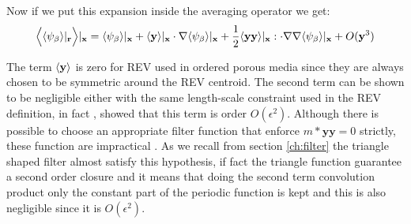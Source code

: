 Now if we put this expansion inside the averaging operator we get:
$$
\Big< {\left< \psi_{\beta} \right>}|_{\mathbf{r}} \Big>|_{\mathbf{x}} = {\left< \psi_{\beta} \right>}|_{\mathbf{x}} + {\left< \mathbf{y} \right>}|_{\mathbf{x}} \cdot \nabla {\left< \psi_{\beta} \right>}|_{\mathbf{x}} + \dfrac{1}{2} {\left< \mathbf{y}\mathbf{y} \right>}|_{\mathbf{x}} : \cdot \nabla \nabla {\left< \psi_{\beta} \right>}|_{\mathbf{x}} + O(\mathbf{y}^3)
$$

The term ${\left< \mathbf{y} \right>}$ is zero for REV used in ordered porous media since they are always chosen to be symmetric around the REV centroid.
The second term can be shown to be negligible either with the same length-scale constraint used in the REV definition, in fact \citet{ochoa1995momentum}, \citet{paez2017macroscopic} showed that this term is order $O(\epsilon^2)$.
Although there is possible to choose an appropriate filter function that  enforce $m*\mathbf{y}\mathbf{y} =0$ strictly, these function are impractical \citet{davit2017technical}.
As we recall from section \ref{ch:filter} the triangle shaped filter almost satisfy this hypothesis, if fact the triangle function guarantee a second order closure and it means that doing the second term convolution product only the constant part of the periodic function is kept and this is also negligible since it is $O(\epsilon^2)$.